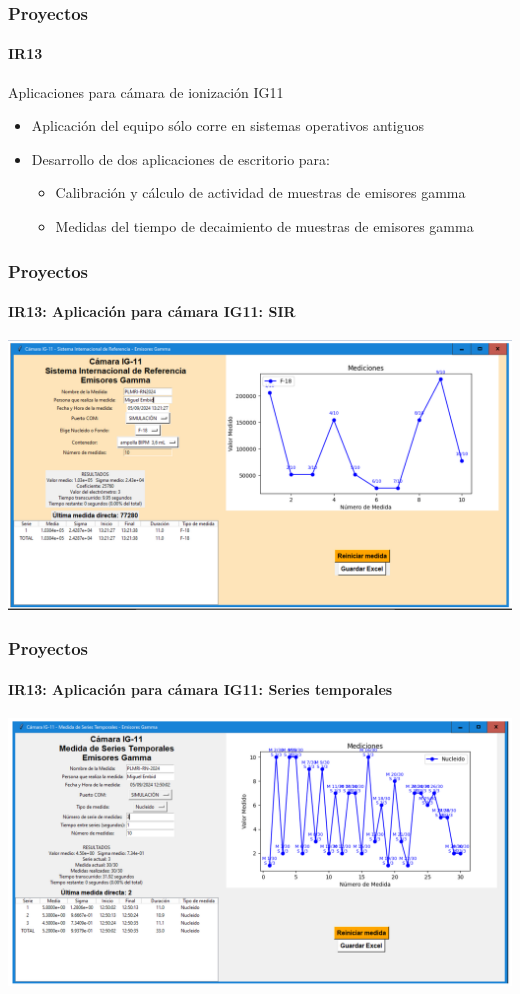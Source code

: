 \documentclass{beamer}
\newcommand{\highlight}[1]{{\color{blue} #1}}
\begin{document}
	\begin{frame}
		\frametitle{Proyectos}
		\framesubtitle{IR13}
		Aplicaciones para cámara de ionización IG11
		\begin{itemize}
			\item Aplicación del equipo sólo corre en \highlight{sistemas operativos antiguos}
			\item Desarrollo de dos \highlight{aplicaciones de escritorio} para:
			\begin{itemize}
				\item Calibración y cálculo de actividad de muestras de emisores gamma
				\item Medidas del tiempo de decaimiento de muestras de emisores gamma
			\end{itemize}
		\end{itemize}
	\end{frame}
	
	\begin{frame}
		\frametitle{Proyectos}
		\framesubtitle{IR13: Aplicación para cámara IG11: SIR}
		\centering
		\includegraphics[width=\textwidth]{IR13_SIR}
	\end{frame}
	
	\begin{frame}
		\frametitle{Proyectos}
		\framesubtitle{IR13: Aplicación para cámara IG11: Series temporales}
		\centering
		\includegraphics[width=\textwidth]{IR13_series_temporales}
	\end{frame}
	
\end{document}
